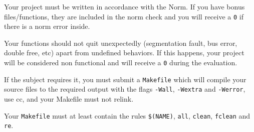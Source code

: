 \item Your project must be written in accordance with the Norm.
        If you have bonus files/functions, they are included in the norm check
        and you will receive a \texttt{0} if there is a norm error inside.

\item Your functions should not quit unexpectedly (segmentation
        fault, bus error, double free, etc) apart from undefined
        behaviors. If this happens, your project will be considered non
        functional and will receive a \texttt{0} during the evaluation.
    
\item If the subject requires it, you must submit a \texttt{Makefile}
        which will compile your source files to the required output
        with the flags \texttt{-Wall}, \texttt{-Wextra} and \texttt{-Werror},
        use cc, and your Makefile must not relink.

\item Your \texttt{Makefile} must at least contain the rules
        \texttt{\$(NAME)}, \texttt{all}, \texttt{clean},
        \texttt{fclean} and \texttt{re}.